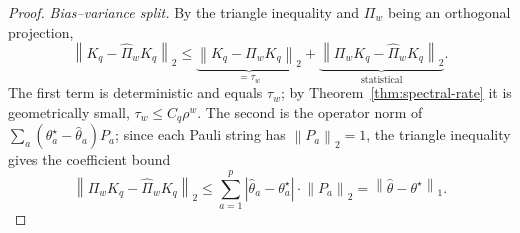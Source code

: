 \documentclass[aps,prresearch,reprint,superscriptaddress,nofootinbib,amsmath,amssymb]{revtex4-2}
\newcommand{\norm}[1]{\left\lVert #1 \right\rVert}
\newcommand{\abs}[1]{\left\lvert #1 \right\rvert}
\begin{document}
\begin{proof}
\emph{Bias--variance split.} By the triangle inequality and $\Pi_w$ being an orthogonal projection,
\begin{equation}
    \norm{K_q-\widehat\Pi_wK_q}_2\leq\underbrace{\norm{K_q-\Pi_wK_q}_2}_{=\tau_w}+\underbrace{\norm{\Pi_wK_q-\widehat\Pi_wK_q}_2}_{\text{statistical}}.
    \label{eq:split}
\end{equation}
The first term is deterministic and equals $\tau_w$; by Theorem~\ref{thm:spectral-rate} it is geometrically small, $\tau_w\leq C_q\rho^w$. The second is the operator norm of $\sum_a(\theta_a^\star-\hat\theta_a)P_a$; since each Pauli string has $\norm{P_a}_2=1$, the triangle inequality gives the coefficient bound
\begin{equation}
    \norm{\Pi_wK_q-\widehat\Pi_wK_q}_2\leq\sum_{a=1}^{p}\abs{\hat\theta_a-\theta_a^\star}\cdot\norm{P_a}_2=\norm{\hat\theta-\theta^\star}_1 .
    \label{eq:op-to-coeff}
\end{equation}


\end{proof}
\end{document}
